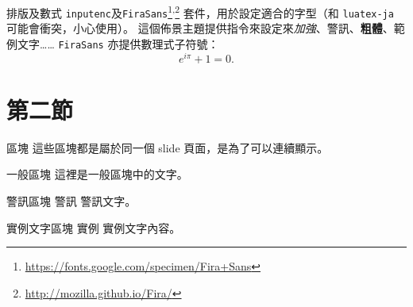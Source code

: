 \documentclass[hyperref={bookmarks=false}]{beamer}
\begin{document}
\begin{frame}{\iyan 排版及數式}
 \texttt{inputenc}及\texttt{FiraSans}\footnote{\url{https://fonts.google.com/specimen/Fira+Sans}}\textsuperscript{,}\footnote{\url{http://mozilla.github.io/Fira/}} 套件，用於設定適合的字型（和 \texttt{luatex-ja} 可能會衝突，小心使用）。
  \vfill
  這個佈景主題提供指令來設定來\emph{加強}、\alert{警訊}、\textbf{粗體}、\textcolor{example}{範例文字}……
  \vfill
  \texttt{FiraSans} 亦提供數理式子符號：
  \begin{equation*}
    e^{i\pi} + 1 = 0.
  \end{equation*}
\end{frame}


\section{第二節}


\begin{frame}{\iyan 區塊}
  這些區塊都是屬於同一個 slide 頁面，是為了可以連續顯示。
  \begin{block}{一般區塊}
    這裡是一般區塊中的文字。
  \end{block}
  \pause %
  \begin{alertblock}{警訊區塊}
    警訊 \alert{警訊文字}。
  \end{alertblock}
  \pause %
  \begin{exampleblock}{實例文字區塊}
    實例 \textcolor{example}{實例文字內容}。
  \end{exampleblock}
\end{frame}

\end{document}

